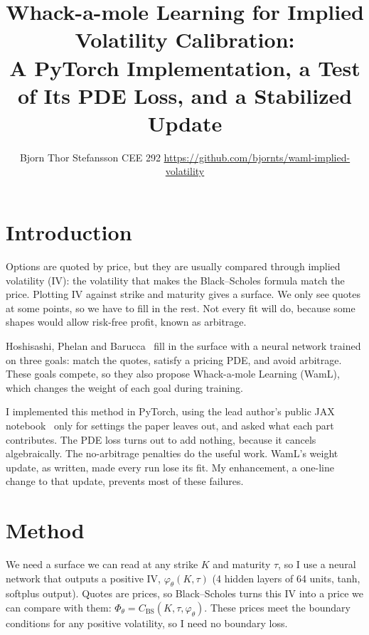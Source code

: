 \documentclass[10pt]{article}
\title{\vspace{-2.2em}Whack-a-mole Learning for Implied Volatility Calibration:\\
\large A PyTorch Implementation, a Test of Its PDE Loss, and a Stabilized Update\vspace{-0.4em}}
\author{Bjorn Thor Stefansson \quad CEE 292 \quad \small\url{https://github.com/bjornts/waml-implied-volatility}\vspace{-0.6em}}
\date{}
\begin{document}
\maketitle
\vspace{-2.4em}

\section{Introduction}
Options are quoted by price, but they are usually compared through implied volatility (IV): the volatility that makes the Black--Scholes formula match the price. Plotting IV against strike and maturity gives a surface. We only see quotes at some points, so we have to fill in the rest. Not every fit will do, because some shapes would allow risk-free profit, known as arbitrage.

Hoshisashi, Phelan and Barucca~\cite{waml} fill in the surface with a neural network trained on three goals: match the quotes, satisfy a pricing PDE, and avoid arbitrage. These goals compete, so they also propose Whack-a-mole Learning (WamL), which changes the weight of each goal during training.

I implemented this method in PyTorch, using the lead author's public JAX notebook~\cite{notebook} only for settings the paper leaves out, and asked what each part contributes. The PDE loss turns out to add nothing, because it cancels algebraically. The no-arbitrage penalties do the useful work. WamL's weight update, as written, made every run lose its fit. My enhancement, a one-line change to that update, prevents most of these failures.

\section{Method}
We need a surface we can read at any strike $K$ and maturity $\tau$, so I use a neural network that outputs a positive IV, $\varphi_\theta(K,\tau)$ (4 hidden layers of 64 units, tanh, softplus output). Quotes are prices, so Black--Scholes turns this IV into a price we can compare with them: $\Phi_\theta=C_{\mathrm{BS}}(K,\tau,\varphi_\theta)$. These prices meet the boundary conditions for any positive volatility, so I need no boundary loss.
\end{document}

